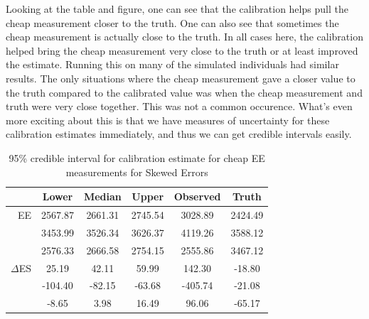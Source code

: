\documentclass[11pt]{article}\usepackage[]{graphicx}\usepackage[]{color}
\begin{document}
Looking at the table and figure, one can see that the calibration helps pull the cheap measurement closer to the truth. One can also see that sometimes the cheap measurement is actually close to the truth. In all cases here, the calibration helped bring the cheap measurement very close to the truth or at least improved the estimate. Running this on many of the simulated individuals had similar results. The only situations where the cheap measurement gave a closer value to the truth compared to the calibrated value was when the cheap measurement and truth were very close together. This was not a common occurence. What's even more exciting about this is that we have measures of uncertainty for these calibration estimates immediately, and thus we can get credible intervals easily.

\begin{table}[ht]
\centering
\begin{tabular}{r|ccc|cc}
  \hline
& Lower & Median & Upper & Observed & Truth \\ 
  \hline
EE & 2567.87 & 2661.31 & 2745.54 & 3028.89 & 2424.49 \\ 
 & 3453.99 & 3526.34 & 3626.37 & 4119.26 & 3588.12 \\ 
 & 2576.33 & 2666.58 & 2754.15 & 2555.86 & 3467.12 \\ 
   \hline  
   $\Delta$ES & 25.19 & 42.11 & 59.99 & 142.30 & -18.80 \\ 
  & -104.40 & -82.15 & -63.68 & -405.74 & -21.08 \\ 
  & -8.65 & 3.98 & 16.49 & 96.06 & -65.17 \\ 
   \hline
\end{tabular}
\caption{95\% credible interval for calibration estimate for cheap EE measurements for Skewed Errors} 
\label{calibratedee}
\end{table}
\end{document}
